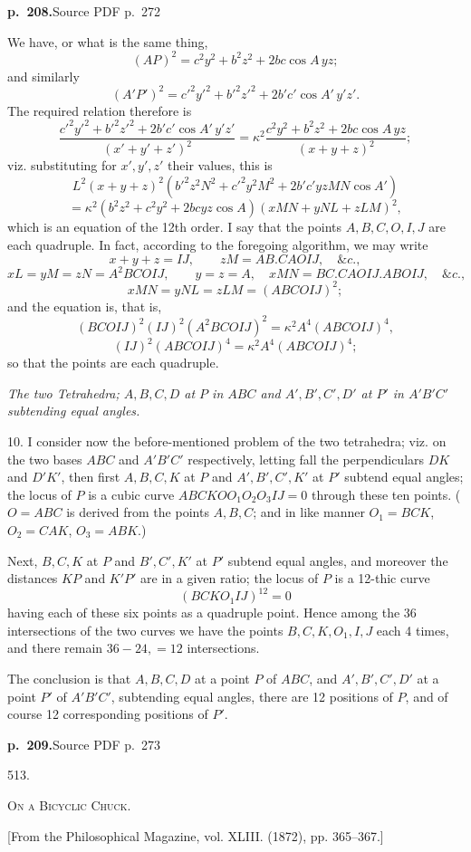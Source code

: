 \documentclass[11pt,a4paper]{article}
\newcommand{\sourcepage}[2]{\par\bigskip\noindent\textbf{p.~#1.}\hfill{\footnotesize Source PDF p.~#2}\par\nobreak\medskip}
\newcommand{\articleno}[1]{\begin{center}\large #1.\end{center}}
\newcommand{\paperhead}[1]{\begin{center}\scshape #1\end{center}}
\newcommand{\journalnote}[1]{\begin{center}\small #1\end{center}}
\begin{document}
\sourcepage{208}{272}
We have, or what is the same thing,
\[
(AP)^2=c^2y^2+b^2z^2+2bc\cos A\,yz;
\]
and similarly
\[
(A'P')^2=c'^2y'^2+b'^2z'^2+2b'c'\cos A'\,y'z'.
\]
The required relation therefore is
\[
\frac{c'^2y'^2+b'^2z'^2+2b'c'\cos A'\,y'z'}{(x'+y'+z')^2}
=\kappa^2
\frac{c^2y^2+b^2z^2+2bc\cos A\,yz}{(x+y+z)^2};
\]
viz. substituting for $x',y',z'$ their values, this is
\[
L^2(x+y+z)^2(b'^2z^2N^2+c'^2y^2M^2+2b'c'yzMN\cos A')
\]
\[
=\kappa^2(b^2z^2+c^2y^2+2bcyz\cos A)(xMN+yNL+zLM)^2,
\]
which is an equation of the 12th order. I say that the points $A,B,C,O,I,J$ are each quadruple. In fact, according to the foregoing algorithm, we may write
\[
x+y+z=IJ,\qquad zM=AB.CAOIJ,\quad \&c.,
\]
\[
xL=yM=zN=A^2BCOIJ,\qquad
y=z=A,\quad xMN=BC.CAOIJ.ABOIJ,\quad \&c.,
\]
\[
xMN=yNL=zLM=(ABCOIJ)^2;
\]
and the equation is, that is,
\[
(BCOIJ)^2(IJ)^2(A^2BCOIJ)^2
=\kappa^2A^4(ABCOIJ)^4,
\]
\[
(IJ)^2(ABCOIJ)^4=\kappa^2A^4(ABCOIJ)^4;
\]
so that the points are each quadruple.

\begin{center}\textit{The two Tetrahedra; $A,B,C,D$ at $P$ in $ABC$ and $A',B',C',D'$ at $P'$ in $A'B'C'$ subtending equal angles.}\end{center}

10. I consider now the before-mentioned problem of the two tetrahedra; viz. on the two bases $ABC$ and $A'B'C'$ respectively, letting fall the perpendiculars $DK$ and $D'K'$, then first $A,B,C,K$ at $P$ and $A',B',C',K'$ at $P'$ subtend equal angles; the locus of $P$ is a cubic curve $ABCKOO_1O_2O_3IJ=0$ through these ten points. ($O=ABC$ is derived from the points $A,B,C$; and in like manner $O_1=BCK$, $O_2=CAK$, $O_3=ABK$.)

Next, $B,C,K$ at $P$ and $B',C',K'$ at $P'$ subtend equal angles, and moreover the distances $KP$ and $K'P'$ are in a given ratio; the locus of $P$ is a 12-thic curve
\[
(BCKO_1IJ)^{12}=0
\]
having each of these six points as a quadruple point. Hence among the 36 intersections of the two curves we have the points $B,C,K,O_1,I,J$ each 4 times, and there remain $36-24,=12$ intersections.

The conclusion is that $A,B,C,D$ at a point $P$ of $ABC$, and $A',B',C',D'$ at a point $P'$ of $A'B'C'$, subtending equal angles, there are 12 positions of $P$, and of course 12 corresponding positions of $P'$.

\clearpage
\sourcepage{209}{273}
\articleno{513}
\paperhead{On a Bicyclic Chuck.}
\journalnote{[From the Philosophical Magazine, vol. XLIII. (1872), pp. 365--367.]}
\end{document}
